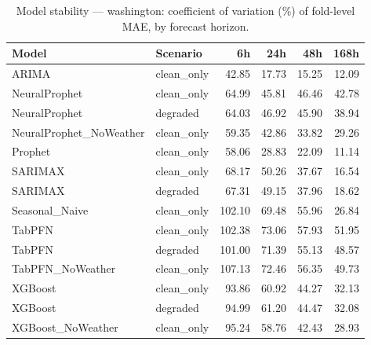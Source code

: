 \begin{table}[h]
\centering
\caption{Model stability — washington: coefficient of variation (\%) of fold-level MAE, by forecast horizon.}
\label{tab:stability_washington}
\begin{tabular}{llrrrr}
\toprule
Model & Scenario & 6h & 24h & 48h & 168h \\
\midrule
ARIMA & clean\_only & 42.85 & 17.73 & 15.25 & 12.09 \\
NeuralProphet & clean\_only & 64.99 & 45.81 & 46.46 & 42.78 \\
NeuralProphet & degraded & 64.03 & 46.92 & 45.90 & 38.94 \\
NeuralProphet\_NoWeather & clean\_only & 59.35 & 42.86 & 33.82 & 29.26 \\
Prophet & clean\_only & 58.06 & 28.83 & 22.09 & 11.14 \\
SARIMAX & clean\_only & 68.17 & 50.26 & 37.67 & 16.54 \\
SARIMAX & degraded & 67.31 & 49.15 & 37.96 & 18.62 \\
Seasonal\_Naive & clean\_only & 102.10 & 69.48 & 55.96 & 26.84 \\
TabPFN & clean\_only & 102.38 & 73.06 & 57.93 & 51.95 \\
TabPFN & degraded & 101.00 & 71.39 & 55.13 & 48.57 \\
TabPFN\_NoWeather & clean\_only & 107.13 & 72.46 & 56.35 & 49.73 \\
XGBoost & clean\_only & 93.86 & 60.92 & 44.27 & 32.13 \\
XGBoost & degraded & 94.99 & 61.20 & 44.47 & 32.08 \\
XGBoost\_NoWeather & clean\_only & 95.24 & 58.76 & 42.43 & 28.93 \\
\bottomrule
\end{tabular}
\end{table}
